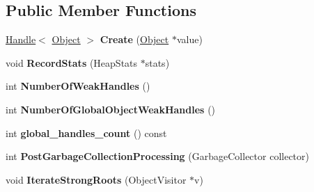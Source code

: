 \subsection*{Public Member Functions}
\begin{DoxyCompactItemize}
\item 
\hypertarget{classv8_1_1internal_1_1_global_handles_af195ba8f98e17aab81b643cecbc60f0a}{}\hyperlink{classv8_1_1internal_1_1_handle}{Handle}$<$ \hyperlink{classv8_1_1internal_1_1_object}{Object} $>$ {\bfseries Create} (\hyperlink{classv8_1_1internal_1_1_object}{Object} $\ast$value)\label{classv8_1_1internal_1_1_global_handles_af195ba8f98e17aab81b643cecbc60f0a}

\item 
\hypertarget{classv8_1_1internal_1_1_global_handles_a0f347ad922f1883463494e754d702699}{}void {\bfseries Record\+Stats} (Heap\+Stats $\ast$stats)\label{classv8_1_1internal_1_1_global_handles_a0f347ad922f1883463494e754d702699}

\item 
\hypertarget{classv8_1_1internal_1_1_global_handles_a5dc0535cb6f4748bee2dd481d66c68d4}{}int {\bfseries Number\+Of\+Weak\+Handles} ()\label{classv8_1_1internal_1_1_global_handles_a5dc0535cb6f4748bee2dd481d66c68d4}

\item 
\hypertarget{classv8_1_1internal_1_1_global_handles_a847a0f050798a343f8f961cf6b0e9aea}{}int {\bfseries Number\+Of\+Global\+Object\+Weak\+Handles} ()\label{classv8_1_1internal_1_1_global_handles_a847a0f050798a343f8f961cf6b0e9aea}

\item 
\hypertarget{classv8_1_1internal_1_1_global_handles_a70def1becf756e921dd90918f964a443}{}int {\bfseries global\+\_\+handles\+\_\+count} () const \label{classv8_1_1internal_1_1_global_handles_a70def1becf756e921dd90918f964a443}

\item 
\hypertarget{classv8_1_1internal_1_1_global_handles_a6ef8aca4011c190d93c07c88f0f85845}{}int {\bfseries Post\+Garbage\+Collection\+Processing} (Garbage\+Collector collector)\label{classv8_1_1internal_1_1_global_handles_a6ef8aca4011c190d93c07c88f0f85845}

\item 
\hypertarget{classv8_1_1internal_1_1_global_handles_a882faa9f4089ce42b4ba2dd3b0aa3fdc}{}void {\bfseries Iterate\+Strong\+Roots} (Object\+Visitor $\ast$v)\label{classv8_1_1internal_1_1_global_handles_a882faa9f4089ce42b4ba2dd3b0aa3fdc}


\end{DoxyCompactItemize}
